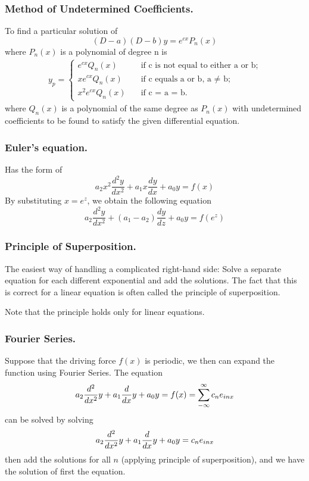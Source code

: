 \documentclass[../main.tex]{subfiles}
\begin{document}
\subsubsection*{Method of Undetermined Coefficients.} To find a particular solution of
\begin{equation*}
    (D - a)(D - b)y=e^{cx}P_n(x)
\end{equation*}
where $P_n(x)$ is a polynomial of degree n is
\begin{align*}
    y_p=
    \begin{cases}
        e^{cx}Q_n(x) \quad&\text{if c is not equal to either a or b;}\\
        xe^{cx}Q_n(x) \quad&\text{if c equals a or b, a  $\neq$ b;}\\
        x^2e^{cx}Q_n(x) \quad&\text{if c = a = b.}
    \end{cases}
\end{align*}
where $Q_n(x)$ is a polynomial of the same degree as $P_n(x)$ with undetermined
coefficients to be found to satisfy the given differential equation.

\subsubsection*{Euler's equation.} Has the form of 
\begin{equation*}
    a_2x^2\frac{d^2y}{dx^2} +a_1x\frac{dy}{dx} +a_0y=f(x)
\end{equation*}
By substituting $x=e^z$, we obtain the following equation 
\begin{equation*}
    a_2\frac{d^2y}{dx^2} +(a_1-a_2)\frac{dy}{dz} +a_0y=f(e^z)
\end{equation*}

\subsubsection*{Principle of Superposition.} The easiest way of handling a complicated right-hand side: Solve a separate equation for each different exponential and add the solutions. The fact that this is correct for a linear equation is often called the principle of superposition. 

Note that the principle holds only for linear equations.

\subsubsection*{Fourier Series.}
Suppose that the driving force $f(x)$ is periodic, we then can expand the function using Fourier Series. The equation
\begin{equation*}
    a_2\frac{d^2}{dx^2} y+a_1\frac{d}{dx} y+a_0y=f(x)=\sum_{-\infty}^{\infty}c_ne_{inx}
\end{equation*}
can be solved by solving
\begin{equation*}
    a_2\frac{d^2}{dx^2} y+a_1\frac{d}{dx} y+a_0y=c_ne_{inx}
\end{equation*}
then add the solutions for all $n$ (applying principle of superposition), and we have the solution of first the equation.
\end{document}
